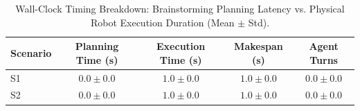 \begin{table}[t]
\centering
\caption{Wall-Clock Timing Breakdown: Brainstorming Planning Latency vs. Physical Robot Execution Duration (Mean $\pm$ Std).}
\label{tab:timing_breakdown}
\begin{tabular}{lcccc}
\toprule
\textbf{Scenario} & \textbf{Planning Time (s)} & \textbf{Execution Time (s)} & \textbf{Makespan (s)} & \textbf{Agent Turns} \\
\midrule
S1 & $0.0 \pm 0.0$ & $1.0 \pm 0.0$ & $1.0 \pm 0.0$ & $0.0 \pm 0.0$ \\
S2 & $0.0 \pm 0.0$ & $1.0 \pm 0.0$ & $1.0 \pm 0.0$ & $0.0 \pm 0.0$ \\
\bottomrule
\end{tabular}
\end{table}